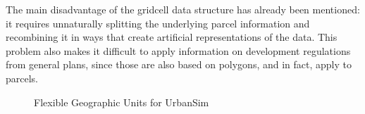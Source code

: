 
The main disadvantage of the gridcell data structure has already been mentioned: it requires unnaturally splitting the underlying parcel information and
recombining it in ways that create artificial representations of the data.  This problem also makes it difficult to apply information on development regulations
from general plans, since those are also based on polygons, and in fact, apply to parcels.

\begin{figure}
\centering
{}
\hspace{1cm}
\hspace{1cm}
\caption{Flexible Geographic Units for UrbanSim}
\label{fig:flexible-geographies} %
\end{figure}


